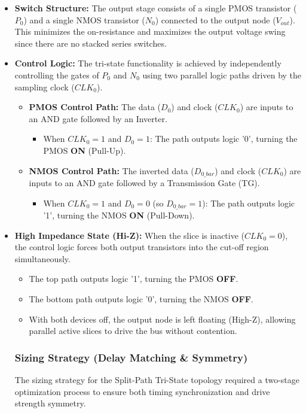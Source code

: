 \documentclass[12pt, a4paper]{report}
\begin{document}
\begin{itemize}
    \item \textbf{Switch Structure:} The output stage consists of a single PMOS transistor ($P_0$) and a single NMOS transistor ($N_0$) connected to the output node ($V_{out}$). This minimizes the on-resistance and maximizes the output voltage swing since there are no stacked series switches.
    
    \item \textbf{Control Logic:} The tri-state functionality is achieved by independently controlling the gates of $P_0$ and $N_0$ using two parallel logic paths driven by the sampling clock ($CLK_0$).
    \begin{itemize}
        \item \textbf{PMOS Control Path:} The data ($D_0$) and clock ($CLK_0$) are inputs to an AND gate followed by an Inverter.
        \begin{itemize}
            \item When $CLK_0 = 1$ and $D_0 = 1$: The path outputs logic '0', turning the PMOS \textbf{ON} (Pull-Up).
        \end{itemize}
        \item \textbf{NMOS Control Path:} The inverted data ($D_{0\_bar}$) and clock ($CLK_0$) are inputs to an AND gate followed by a Transmission Gate (TG).
        \begin{itemize}
             \item When $CLK_0 = 1$ and $D_0 = 0$ (so $D_{0\_bar} = 1$): The path outputs logic '1', turning the NMOS \textbf{ON} (Pull-Down).
        \end{itemize}
    \end{itemize}

    \item \textbf{High Impedance State (Hi-Z):} When the slice is inactive ($CLK_0 = 0$), the control logic forces both output transistors into the cut-off region simultaneously.
    \begin{itemize}
        \item The top path outputs logic '1', turning the PMOS \textbf{OFF}.
        \item The bottom path outputs logic '0', turning the NMOS \textbf{OFF}.
        \item With both devices off, the output node is left floating (High-Z), allowing parallel active slices to drive the bus without contention.
    \end{itemize}
\subsubsection{Sizing Strategy (Delay Matching \& Symmetry)}
The sizing strategy for the Split-Path Tri-State topology required a two-stage optimization process to ensure both timing synchronization and drive strength symmetry.


\end{itemize}
\end{document}
